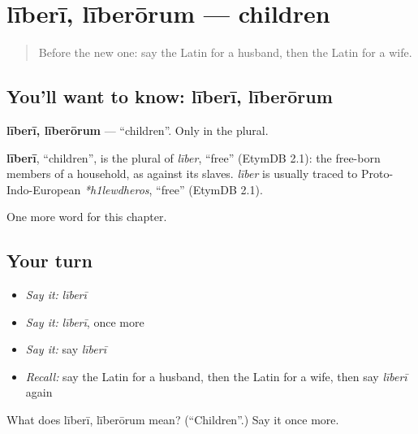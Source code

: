 \section[līberī, līberōrum]{līberī, līberōrum — children}

\label{lesson:LA-C71-liberi}



\begin{quote}
Before the new one: say the Latin for a husband, then the Latin for a wife.
\end{quote}

\subsection*{You'll want to know: līberī, līberōrum}
\textbf{līberī, līberōrum} — \textquotedblleft{}children\textquotedblright{}. Only in the plural.

\begin{cousinweb}
\textbf{līberī}, \textquotedblleft{}children\textquotedblright{}, is the plural of \emph{līber}, \textquotedblleft{}free\textquotedblright{} (EtymDB 2.1): the free-born members of a household, as against its slaves. \emph{līber} is usually traced to Proto-Indo-European \emph{*h1lewdheros}, \textquotedblleft{}free\textquotedblright{} (EtymDB 2.1).
\end{cousinweb}

\begin{grammarlens}[title={What you've built}]
One more word for this chapter.
\end{grammarlens}

\subsection*{Your turn}
\begin{itemize}
\raggedright
  \item \emph{Say it:} \emph{līberī}
  \item \emph{Say it:} \emph{līberī}, once more
  \item \emph{Say it:} say \emph{līberī}
  \item \emph{Recall:} say the Latin for a husband, then the Latin for a wife, then say \emph{līberī} again
\end{itemize}

\begin{tcolorbox}[breakable,colback=teal!4,colframe=teal!35!black,title={Before you move on}]
What does līberī, līberōrum mean? (\textquotedblleft{}Children\textquotedblright{}.) Say it once more.
\end{tcolorbox}
